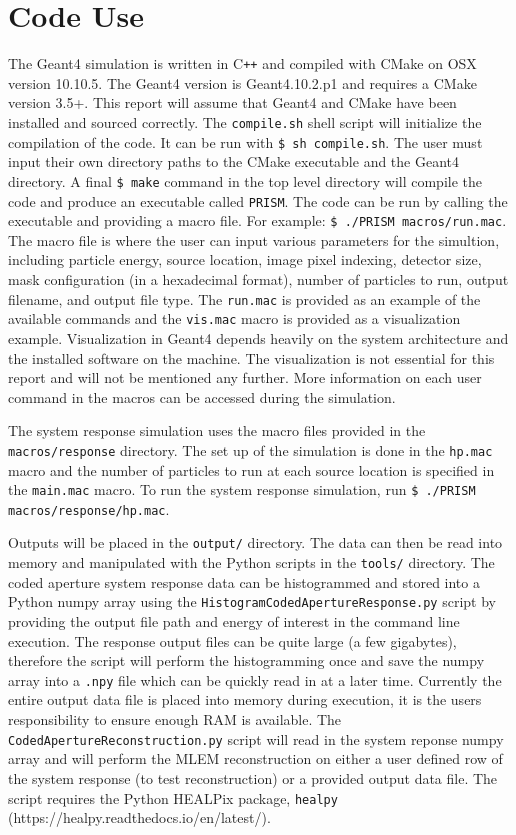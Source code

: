\documentclass[10pt]{article}
\begin{document}
\section{Code Use}

The Geant4 simulation is written in C\verb!++! and compiled with CMake on OSX version 10.10.5. The Geant4 version is Geant4.10.2.p1 and requires a CMake version 3.5+. This report will assume that Geant4 and CMake have been installed and sourced correctly. The \verb!compile.sh! shell script will initialize the compilation of the code. It can be run with \verb!$ sh compile.sh!. The user must input their own directory paths to the CMake executable and the Geant4 directory. A final \verb!$ make! command in the top level directory will compile the code and produce an executable called \verb!PRISM!. The code can be run by calling the executable and providing a macro file. For example: \verb!$ ./PRISM macros/run.mac!. The macro file is where the user can input various parameters for the simultion, including particle energy, source location, image pixel indexing, detector size, mask configuration (in a hexadecimal format), number of particles to run, output filename, and output file type. The \verb!run.mac! is provided as an example of the available commands and the \verb!vis.mac! macro is provided as a visualization example. Visualization in Geant4 depends heavily on the system architecture and the installed software on the machine. The visualization is not essential for this report and will not be mentioned any further. More information on each user command in the macros can be accessed during the simulation.

The system response simulation uses the macro files provided in the \verb!macros/response! directory. The set up of the simulation is done in the \verb!hp.mac! macro and the number of particles to run at each source location is specified in the \verb!main.mac! macro. To run the system response simulation, run \verb!$ ./PRISM macros/response/hp.mac!. 

Outputs will be placed in the \verb!output/! directory. The data can then be read into memory and manipulated with the Python scripts in the \verb!tools/! directory. The coded aperture system response data can be histogrammed and stored into a Python numpy array using the \verb!HistogramCodedApertureResponse.py! script by providing the output file path and energy of interest in the command line execution. The response output files can be quite large (a few gigabytes), therefore the script will perform the histogramming once and save the numpy array into a \verb!.npy! file which can be quickly read in at a later time. Currently the entire output data file is placed into memory during execution, it is the users responsibility to ensure enough RAM is available. The \verb!CodedApertureReconstruction.py! script will read in the system reponse numpy array and will perform the MLEM reconstruction on either a user defined row of the system response (to test reconstruction) or a provided output data file. The script requires the Python HEALPix package, \verb!healpy! (https://healpy.readthedocs.io/en/latest/).
\end{document}
